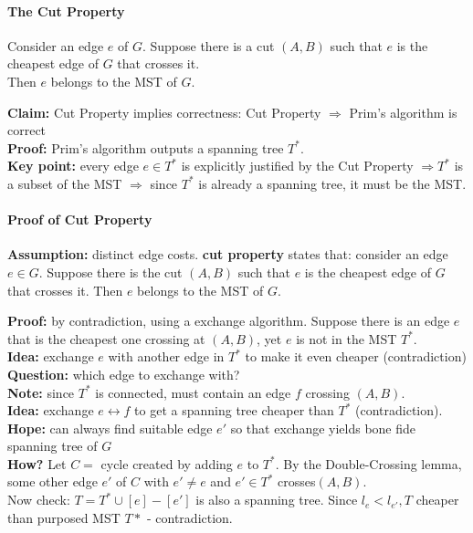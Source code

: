 \documentclass{scrartcl}
\begin{document}
\paragraph{The Cut Property}

Consider an edge $e$ of $G$. Suppose there is a cut $(A, B)$ such that $e$ is
the cheapest edge of $G$ that crosses it.\\
Then $e$ belongs to the MST of $G$.

{\bf Claim: } Cut Property implies correctness: Cut Property $\Rightarrow$
Prim's algorithm is correct\\
{\bf Proof: } Prim's algorithm outputs a spanning tree $T^*$. \\
{\bf Key point: } every edge $e \in T^*$ is explicitly justified by the Cut
Property $\Rightarrow T^*$ is a subset of the MST $\Rightarrow$ since $T^*$ is
already a spanning tree, it must be the MST.

\paragraph{Proof of Cut Property}
 {\bf Assumption: } distinct edge costs. {\bf cut property
}states that: consider an edge $e \in G$. Suppose there is the cut $(A, B)$ such
that $e$ is the cheapest edge of $G$ that crosses it. Then $e$ belongs to the
MST of $G$.

{\bf Proof: } by contradiction, using a exchange algorithm. Suppose there is an
edge $e$ that is the cheapest one crossing at $(A, B)$, yet $e$ is not in the
MST $T^*$.\\
{\bf Idea: } exchange $e$ with another edge in $T^*$ to make it even cheaper
(contradiction) \\
{\bf Question: } which edge to exchange with?\\
{\bf Note: } since $T^*$ is connected, must contain an edge $f$ crossing $(A,
B)$.\\
{\bf Idea: } exchange $e \leftrightarrow f$ to get a spanning tree cheaper than
$T^*$ (contradiction).\\
{\bf Hope: } can always find suitable edge $e'$ so that exchange yields bone
fide spanning tree of $G$\\
{\bf How? } Let $C =$ cycle created by adding $e$ to $T^*$. By the
Double-Crossing lemma, some other edge $e'$ of $C$ with $e' \neq e$ and $e' \in
T^*$ crosses$(A, B)$.\\
Now check: $T = T^* \cup [e] - [e']$ is also a spanning tree. Since $l_e <
l_{e'}, T$ cheaper than purposed MST $T*$ - contradiction.
\end{document}
